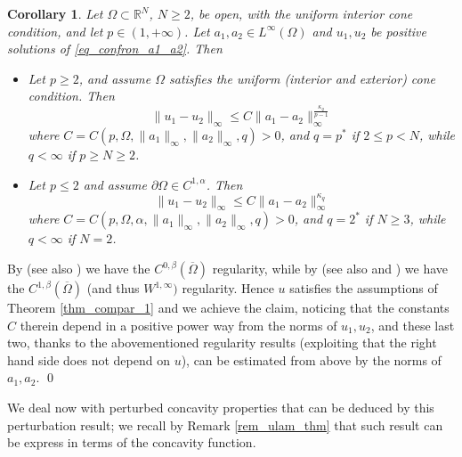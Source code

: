 \documentclass[11pt, reqno]{amsart}
\newtheorem{corollary}[lemma]{Corollary}
\theoremstyle{definition}
\numberwithin{equation}{section}
\newcommand{\R}{\mathbb{R}}
\def\norm#1{\|#1\|}
\renewenvironment{proof}[1][\proofname]{\medskip \noindent {\bfseries #1. }}{\qed \bigskip}
\begin{document}
\begin{corollary}
\label{corol_confron_2}
Let $\Omega \subset \R^N$, $N \geq 2$, be open, with the uniform interior cone condition, and let $p \in (1,+\infty)$. 
Let $a_1, a_2 \in L^{\infty}(\Omega)$ and $u_1, u_2$ be positive solutions of \eqref{eq_confron_a1_a2}. 
Then 
\begin{itemize}
\item Let $p \geq 2$, and assume $\Omega$ satisfies the uniform (interior and exterior) cone condition. Then 
$$\norm{u_1-u_2}_{\infty} \leq C \norm{a_1 -a_2}_{\infty}^{\frac{\kappa_{q}}{p-1}}$$
where $C=C(p, \Omega, \norm{a_1}_{\infty}, \norm{a_2}_{\infty}, q)>0$, and $q=p^*$ if $2 \leq p<N$, while $q<\infty$ if $p\geq N \geq 2$. 
\item Let $p \leq 2$ and assume $\partial \Omega \in C^{1,\alpha}$. 
Then
$$\norm{u_1 - u_2}_{\infty} \leq C \norm{a_1 -a_2}_{\infty}^{\kappa_{q}} $$
where $C=C(p, \Omega, \alpha, \norm{a_1}_{\infty}, \norm{a_2}_{\infty}, q)>0$, and $q=2^*$ if $N\geq 3$, while $q <\infty$ if $N= 2$. 
\end{itemize}
\end{corollary}

\begin{proof}
By \cite[Corollary 4.2]{Tru67} (see also \cite[Theorem 2.3]{BPS22}) we have the $C^{0,\beta}(\overline{\Omega})$ regularity, while by \cite[Theorem 1]{Lie88} (see also \cite[Corollary 1.1]{GuVe89} and \cite[Section 4.4]{LaUr66}) we have the $C^{1,\beta}(\overline{\Omega})$ (and thus $W^{1,\infty})$ regularity. 
Hence $u$ satisfies the assumptions of Theorem \ref{thm_compar_1} and we achieve the claim, noticing that the constants $C$ therein depend in a positive power way from the norms of $u_1,u_2$, and these last two, thanks to the abovementioned regularity results (exploiting that the right hand side does not depend on $u$), can be estimated from above by the norms of $a_1,a_2$.
\end{proof}

We deal now with perturbed concavity properties that can be deduced by this perturbation result; we recall by Remark \ref{rem_ulam_thm} that such result can be express in terms of the concavity function.
\end{document}
